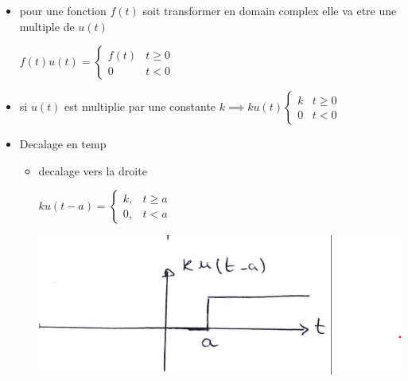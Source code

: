\documentclass[12pt]{book}
\begin{document}
            \begin{itemize}
                \item pour une fonction $f(t)$ soit transformer en domain complex elle va etre une multiple de $u(t)$
                    \begin{center}
                        $f(t)u(t) = \begin{cases}
                            f(t) & t \geq 0 \\
                            0 & t< 0
                        \end{cases}$
                    \end{center}
                \item  si $u(t)$ est multiplie par une constante $k \implies ku(t) \begin{cases}
                    k & t \geq 0 \\
                    0 & t < 0
                \end{cases}$
                \item Decalage en temp 
                    \begin{itemize}
                        \item decalage vers la droite 
                        \begin{center}
                            \begin{minipage}{0.49\linewidth}
                                $ku(t-a) = 
                                \begin{cases}
                                    k, & t \geq a \\
                                    0, & t < a
                                \end{cases}
                                $
                            \end{minipage}
                            \begin{minipage}{0.39\linewidth}
                                \includegraphics[width = \linewidth]{pic/droitdecalageunite.png}

\end{minipage}
\end{center}
\end{itemize}
\end{itemize}
\end{document}
